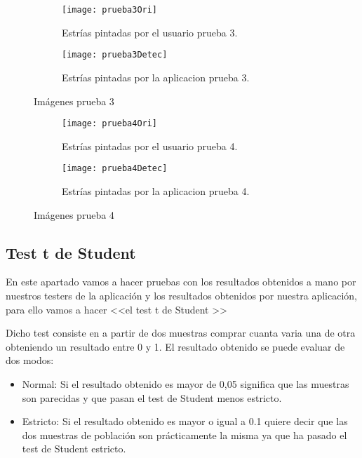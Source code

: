 \begin{figure}
	\begin{subfigure}[c]{.5\linewidth}
	\centering\large \texttt{[image: prueba3Ori]}
	\caption{Estrías pintadas por el usuario prueba 3.}\label{fig:orip3}
	\end{subfigure}%
	\begin{subfigure}[c]{.5\linewidth}
	\centering\large \texttt{[image: prueba3Detec]}
	\caption{Estrías pintadas por la aplicacion prueba 3.}\label{fig:calcp3}
	\end{subfigure}%
	\caption{Imágenes prueba 3}
	\label{fig:p3}

\end{figure}



\begin{figure}
	\begin{subfigure}[c]{.5\linewidth}
	\centering\large \texttt{[image: prueba4Ori]}
	\caption{Estrías pintadas por el usuario prueba 4.}\label{fig:orip4} 
	\end{subfigure}%
	\begin{subfigure}[c]{.5\linewidth}
	\centering\large \texttt{[image: prueba4Detec]}
	\caption{Estrías pintadas por la aplicacion prueba 4.}\label{fig:calcp4}
	\end{subfigure}%
	\caption{Imágenes prueba 4}
	\label{fig:p4}

\end{figure}

\subsection{Test t de Student}
En este apartado vamos a hacer pruebas con los resultados obtenidos a mano por nuestros testers de la aplicación y los resultados obtenidos por nuestra aplicación, para ello vamos a hacer <<el test t de Student \cite{wiki:testStude}>>

Dicho test consiste en a partir de dos muestras comprar cuanta varia una de otra obteniendo un resultado entre 0 y 1. El resultado obtenido se puede evaluar de dos modos:
\begin{itemize}
\item Normal: Si el resultado obtenido es mayor de 0,05 significa que las muestras son parecidas y que pasan el test de Student menos estricto.
\item Estricto: Si el resultado obtenido es mayor o igual a 0.1 quiere decir que las dos muestras de población son prácticamente la misma ya que ha pasado el test de Student estricto.
\end{itemize} 

